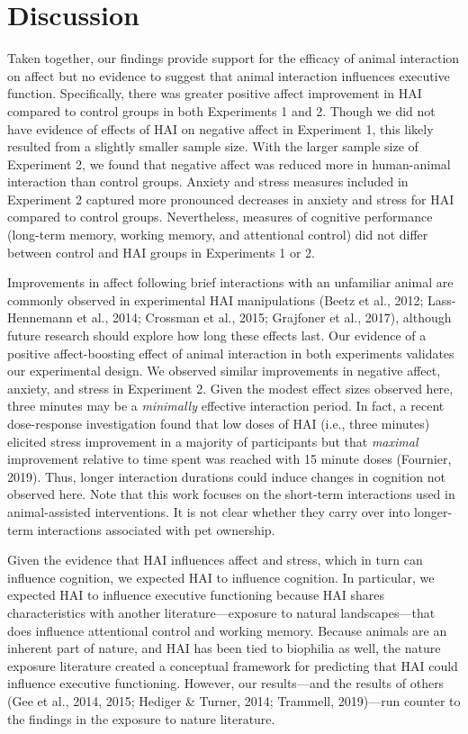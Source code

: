 \documentclass[
  english,
  pub,floatsintext]{apa6}
\begin{document}
\hypertarget{discussion}{%
\section{Discussion}\label{discussion}}

Taken together, our findings provide support for the efficacy of animal interaction on affect but no evidence to suggest that animal interaction influences executive function. Specifically, there was greater positive affect improvement in HAI compared to control groups in both Experiments 1 and 2. Though we did not have evidence of effects of HAI on negative affect in Experiment 1, this likely resulted from a slightly smaller sample size. With the larger sample size of Experiment 2, we found that negative affect was reduced more in human-animal interaction than control groups. Anxiety and stress measures included in Experiment 2 captured more pronounced decreases in anxiety and stress for HAI compared to control groups. Nevertheless, measures of cognitive performance (long-term memory, working memory, and attentional control) did not differ between control and HAI groups in Experiments 1 or 2.

Improvements in affect following brief interactions with an unfamiliar animal are commonly observed in experimental HAI manipulations (Beetz et al., 2012; Lass-Hennemann et al., 2014; Crossman et al., 2015; Grajfoner et al., 2017), although future research should explore how long these effects last. Our evidence of a positive affect-boosting effect of animal interaction in both experiments validates our experimental design. We observed similar improvements in negative affect, anxiety, and stress in Experiment 2. Given the modest effect sizes observed here, three minutes may be a \emph{minimally} effective interaction period. In fact, a recent dose-response investigation found that low doses of HAI (i.e., three minutes) elicited stress improvement in a majority of participants but that \emph{maximal} improvement relative to time spent was reached with 15 minute doses (Fournier, 2019). Thus, longer interaction durations could induce changes in cognition not observed here. Note that this work focuses on the short-term interactions used in animal-assisted interventions. It is not clear whether they carry over into longer-term interactions associated with pet ownership.

Given the evidence that HAI influences affect and stress, which in turn can influence cognition, we expected HAI to influence cognition. In particular, we expected HAI to influence executive functioning because HAI shares characteristics with another literature---exposure to natural landscapes---that does influence attentional control and working memory. Because animals are an inherent part of nature, and HAI has been tied to biophilia as well, the nature exposure literature created a conceptual framework for predicting that HAI could influence executive functioning. However, our results---and the results of others (Gee et al., 2014, 2015; Hediger \& Turner, 2014; Trammell, 2019)---run counter to the findings in the exposure to nature literature.
\end{document}
